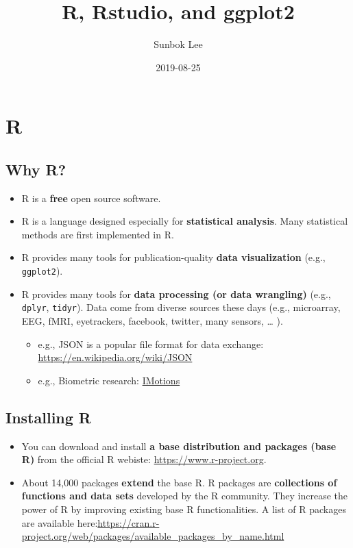 \documentclass[]{book}
\title{R, Rstudio, and ggplot2}
\author{Sunbok Lee}
\date{2019-08-25}
\providecommand{\tightlist}{%
  \setlength{\itemsep}{0pt}\setlength{\parskip}{0pt}}
\begin{document}
\maketitle

{
\setcounter{tocdepth}{1}
\tableofcontents
}
\chapter{R}\label{r}

\section{Why R?}\label{why-r}

\begin{itemize}
\tightlist
\item
  R is a \textbf{free} open source software.
\item
  R is a language designed especially for \textbf{statistical analysis}.
  Many statistical methods are first implemented in R.
\item
  R provides many tools for publication-quality \textbf{data
  visualization} (e.g., \texttt{ggplot2}).
\item
  R provides many tools for \textbf{data processing (or data wrangling)}
  (e.g., \texttt{dplyr}, \texttt{tidyr}). Data come from diverse sources
  these days (e.g., microarray, EEG, fMRI, eyetrackers, facebook,
  twitter, many sensors, \ldots{} ).

  \begin{itemize}
  \tightlist
  \item
    e.g., JSON is a popular file format for data exchange:
    \url{https://en.wikipedia.org/wiki/JSON}
  \item
    e.g., Biometric research:
    \href{https://imotions.com/?creative=287840870074\&keyword=imotions\&matchtype=p\&network=g\&device=c\&gclid=EAIaIQobChMI3pas5oOO5AIVlBx9Ch28hwboEAAYASAAEgJlUfD_BwE}{IMotions}
  \end{itemize}
\end{itemize}

\section{Installing R}\label{installing-r}

\begin{itemize}
\item
  You can download and install \textbf{a base distribution and packages
  (base R)} from the official R webiste:
  \url{https://www.r-project.org}.
\item
  About 14,000 packages \textbf{extend} the base R. R packages are
  \textbf{collections of functions and data sets} developed by the R
  community. They increase the power of R by improving existing base R
  functionalities. A list of R packages are available
  here:\url{https://cran.r-project.org/web/packages/available_packages_by_name.html}
\end{itemize}
\end{document}
